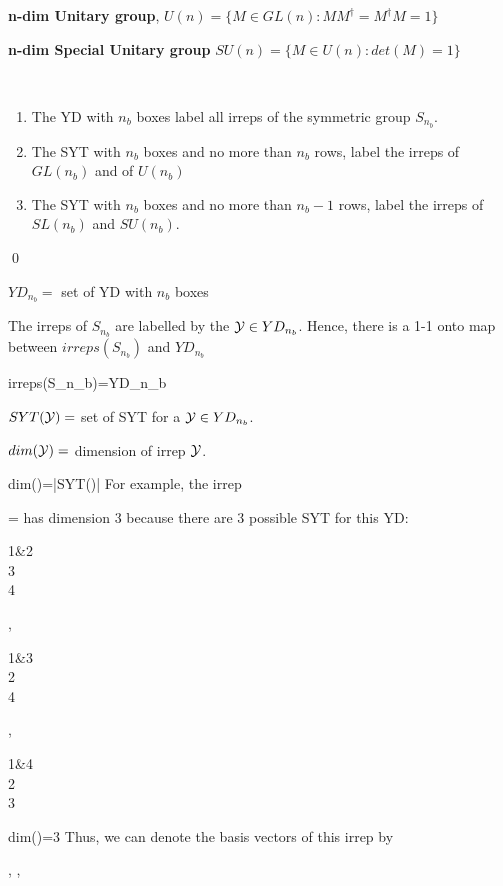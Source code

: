 {\bf n-dim Unitary group}, $U(n)=\{ M\in GL(n):
M M^\dagger =M^\dagger M =1\}$

{\bf n-dim Special Unitary group}
$SU(n)=\{ M\in U(n):
det(M)=1\}$


\begin{claim}\
\begin{enumerate}
\item
The YD with $n_b$ boxes label all irreps of the symmetric group 
$S_{n_b}$.

\item
The SYT with $n_b$ boxes and no more than $n_b$ rows,
label the irreps of $GL(n_b)$ and of $U(n_b)$
\item
The SYT with $n_b$ boxes and
no more than $n_b-1$
rows, label the irreps of $SL(n_b)$ and $SU(n_b)$.
\end{enumerate}
\end{claim}
\proof
\qed



$YD_{n_b}=$ set of YD with $n_b$ boxes

The irreps of $S_{n_b}$  are labelled by the ${\cal Y}\in YD_{n_b}$. 
Hence, there is a 1-1 onto map between $irreps(S_{n_b})$ and $YD_{n_b}$


\beq
irreps(S_{n_b})=YD_{n_b}
\eeq


$SYT({\cal Y})=$ set of SYT for a ${\cal Y}\in YD_{n_b}$.


$dim({\cal Y})=$ dimension of irrep ${\cal Y}$.

\beq
dim(\caly)=|SYT(\caly)|
\eeq
For example, the 
irrep 

\beq
\caly=
\eeq
has dimension 3 because there are 3 possible SYT for this YD:

\beq
\begin{ytableau}
1&2
\\
3
\\
4
\end{ytableau}
,\quad
\begin{ytableau}
1&3
\\
2
\\
4
\end{ytableau}
,\quad
\begin{ytableau}
1&4
\\
2
\\
3
\end{ytableau}
\implies dim(\caly)=3
\eeq
Thus, we can denote the
basis vectors of this irrep by

\beq
{}
,\quad
{}
,\quad
{}
\eeq

